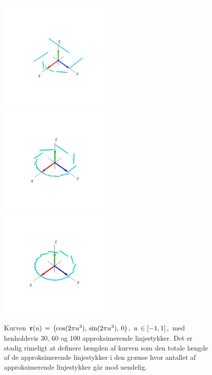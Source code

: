 \begin{figure}[ht]
\centerline{\includegraphics[height=55mm]{FIGS/plotCtredjeapp1}\,\,\,\,\,\includegraphics[height=55mm]{FIGS/plotCtredjeapp2}\,\,\,\,\,\includegraphics[height=55mm]{FIGS/plotCtredjeapp3}}
\begin{center}
\caption{\small{ Kurven ${\bf r}(u) \, = \,
\left(\cos(2\pi u^{3}), \,\sin(2\pi u^{3}),\,
0\right), \, \, u \, \in [-1, 1]\, ,$ med
henholdsvis 30, 60 og 100 approksimerende
linjestykker. Det er stadig rimeligt at definere
længden af kurven som den totale længde af de
approksimerende linjestykker i den grænse hvor
antallet af approksimerende linjestykker går mod
uendelig.}} \label{figcircAppB123}
\end{center}
\end{figure}






